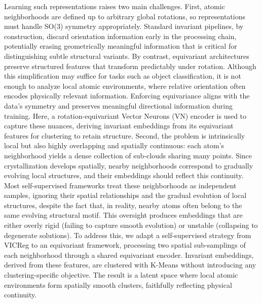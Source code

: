 \documentclass[runningheads]{llncs}
\begin{document}
Learning such representations raises two main challenges. First, atomic neighborhoods are defined up to arbitrary global rotations, so representations must handle SO(3) symmetry appropriately.
Standard invariant pipelines, by construction, discard orientation information early in the processing chain, potentially erasing geometrically meaningful information that is critical for distinguishing subtle structural variants.
By contrast, equivariant architectures preserve structured features that transform predictably under rotation.
Although this simplification may suffice for tasks such as object classification, it is not enough to analyze local atomic environments, where relative orientation often encodes physically relevant information.
Enforcing equivariance aligns with the data’s symmetry and preserves meaningful directional information during training. Here, a rotation-equivariant Vector Neurons (VN) encoder is used to capture these nuances, deriving invariant embeddings from its equivariant features for clustering to retain structure.
Second, the problem is intrinsically local but also highly overlapping and spatially continuous: each atom’s neighborhood yields a dense collection of sub-clouds sharing many points.
Since crystallization develops spatially, nearby neighborhoods correspond to gradually evolving local structures, and their embeddings should reflect this continuity.
Most self-supervised frameworks treat these neighborhoods as independent samples, ignoring their spatial relationships and the gradual evolution of local structures, despite the fact that, in reality, nearby atoms often belong to the same evolving structural motif.
This oversight produces embeddings that are either overly rigid (failing to capture smooth evolution) or unstable (collapsing to degenerate solutions).
To address this, we adapt a self-supervised strategy from VICReg to an equivariant framework, processing two spatial sub-samplings of each neighborhood through a shared equivariant encoder. Invariant embeddings, derived from these features, are clustered with K-Means without introducing any clustering-specific objective. The result is a latent space where local atomic environments form spatially smooth clusters, faithfully reflecting physical continuity.
\end{document}
